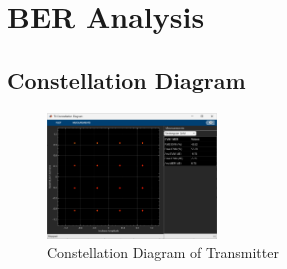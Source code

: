 \documentclass[10pt]{article}
\numberwithin{figure}{section}
\numberwithin{equation}{section}
\begin{document}
\section{BER Analysis}
\subsection{Constellation Diagram}
\begin{figure}[!h]
    \centering
    \includegraphics[width=0.4\textwidth]{images/TX Constellation Diagram.png}
    \caption{Constellation Diagram of Transmitter}
    \label{fig:TXConstellation}
\end{figure}
\end{document}
